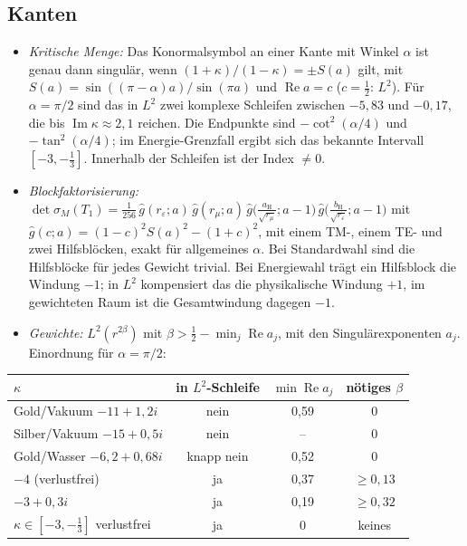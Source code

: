 \documentclass[11pt, a4paper]{article}
\newcommand{\st}[1]{{\small\sffamily[#1]}}
\begin{document}
\subsection{Kanten}
\begin{itemize}[leftmargin=*]
  \item \emph{Kritische Menge:} Das Konormalsymbol an einer Kante mit Winkel $\alpha$ ist
    genau dann singulär, wenn $(1+\kappa)/(1-\kappa)=\pm S(a)$ gilt, mit
    $S(a)=\sin((\pi-\alpha)a)/\sin(\pi a)$ und $\operatorname{Re}a=c$ ($c=\tfrac12$: $L^2$). Für
    $\alpha=\pi/2$ sind das in $L^2$ zwei komplexe Schleifen zwischen $-5{,}83$ und
    $-0{,}17$, die bis $\operatorname{Im}\kappa\approx2{,}1$ reichen. Die Endpunkte sind
    $-\cot^2(\alpha/4)$ und $-\tan^2(\alpha/4)$; im Energie-Grenzfall ergibt sich das
    bekannte Intervall $[-3,-\tfrac13]$. Innerhalb der Schleifen ist der Index $\neq0$.
    \st{exakt}
  \item \emph{Blockfaktorisierung:}
    $\det\sigma_M(T_1)=\tfrac1{256}\,\hat g(r_\varepsilon;a)\,\hat g(r_\mu;a)\,
    \hat g\big(\tfrac{a_{\mathrm H}}{\sqrt{r_\mu}};a-1\big)\,\hat g\big(\tfrac{b_{\mathrm H}}{\sqrt{r_\varepsilon}};a-1\big)$
    mit $\hat g(c;a)=(1-c)^2S(a)^2-(1+c)^2$,
    mit einem TM-, einem TE- und zwei Hilfsblöcken, exakt für allgemeines $\alpha$. Bei
    Standardwahl sind die Hilfsblöcke für jedes Gewicht trivial. Bei Energiewahl trägt ein
    Hilfsblock die Windung $-1$; in $L^2$ kompensiert das die physikalische Windung $+1$,
    im gewichteten Raum ist die Gesamtwindung dagegen $-1$. \st{exakt}
  \item \emph{Gewichte:} $L^2(r^{2\beta})$ mit $\beta>\tfrac12-\min_j\operatorname{Re}a_j$, mit den
    Singulärexponenten $a_j$. Einordnung für $\alpha=\pi/2$:
\end{itemize}
\begin{center}\small
\begin{tabular}{lccc}
\toprule
$\kappa$ & in $L^2$-Schleife & $\min\operatorname{Re}a_j$ & nötiges $\beta$\\
\midrule
Gold/Vakuum $-11+1{,}2i$ & nein & 0,59 & 0\\
Silber/Vakuum $-15+0{,}5i$ & nein & -- & 0\\
Gold/Wasser $-6{,}2+0{,}68i$ & knapp nein & 0,52 & 0\\
$-4$ (verlustfrei) & ja & 0,37 & $\ge0{,}13$\\
$-3+0{,}3i$ & ja & 0,19 & $\ge0{,}32$\\
$\kappa\in[-3,-\tfrac13]$ verlustfrei & ja & 0 & keines\\
\bottomrule
\end{tabular}
\end{center}
\end{document}
